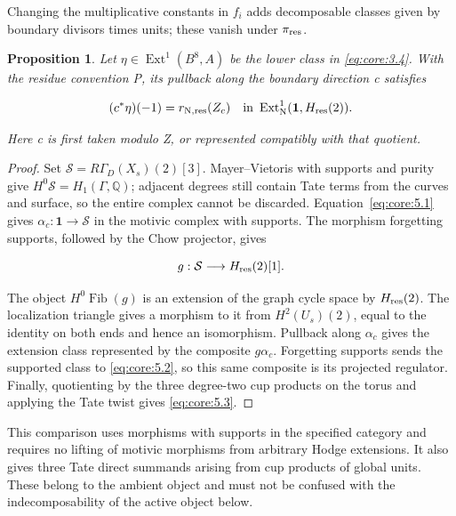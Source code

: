 \documentclass[11pt,a4paper,oneside]{article}
\theoremstyle{plain}
\newtheorem{proposition}[theorem]{Proposition}
\theoremstyle{definition}
\theoremstyle{remark}
\numberwithin{equation}{section}
\begin{document}
Changing the multiplicative constants in \(f_i\) adds decomposable classes given by boundary divisors times units; these vanish under \(\pi_{\rm res}\).

\begin{proposition}

\label{thm:core:5.1} Let \(\eta\in\operatorname{Ext}^1(B^8,A)\) be the lower class in \eqref{eq:core:3.4}. With the residue convention P, its pullback along the boundary direction c satisfies

\begin{equation}
(c^*\eta)(-1)
                 =r_{{\rm N},{\rm res}}(Z_c)
       \quad\text{in }\operatorname{Ext}^1_{\rm N}
                  (\mathbf1,H_{\rm res}(2)).             \label{eq:core:5.3}
\end{equation}

Here c is first taken modulo Z, or represented compatibly with that quotient.

\end{proposition}

\begin{proof}

Set \(\mathcal S=R\Gamma_D(X_s)(2)[3]\). Mayer--Vietoris with supports and purity give \(H^0\mathcal S=H_1(\Gamma,\mathbb Q)\); adjacent degrees still contain Tate terms from the curves and surface, so the entire complex cannot be discarded. Equation~\eqref{eq:core:5.1} gives \(\alpha_c:\mathbf1\to\mathcal S\) in the motivic complex with supports. The morphism forgetting supports, followed by the Chow projector, gives

\begin{equation}
g:\mathcal S\longrightarrow H_{\rm res}(2)[1].
\end{equation}

The object \(H^0\operatorname{Fib}(g)\) is an extension of the graph cycle space by \(H_{\rm res}(2)\). The localization triangle gives a morphism to it from \(H^2(U_s)(2)\), equal to the identity on both ends and hence an isomorphism. Pullback along \(\alpha_c\) gives the extension class represented by the composite \(g\alpha_c\). Forgetting supports sends the supported class to \eqref{eq:core:5.2}, so this same composite is its projected regulator. Finally, quotienting by the three degree-two cup products on the torus and applying the Tate twist gives \eqref{eq:core:5.3}.

\end{proof}

This comparison uses morphisms with supports in the specified category and requires no lifting of motivic morphisms from arbitrary Hodge extensions. It also gives three Tate direct summands arising from cup products of global units. These belong to the ambient object and must not be confused with the indecomposability of the active object below.
\end{document}

